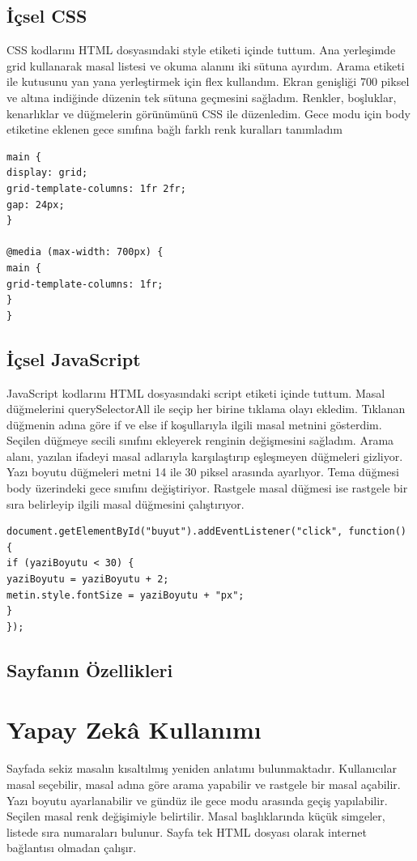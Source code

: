 \documentclass[12pt,a4paper]{article}
\begin{document}
\subsection{İçsel CSS}
CSS kodlarını HTML dosyasındaki style etiketi içinde tuttum. Ana yerleşimde grid kullanarak masal listesi ve okuma alanını iki sütuna ayırdım. Arama etiketi ile kutusunu yan yana yerleştirmek için flex kullandım. Ekran genişliği 700 piksel ve altına indiğinde düzenin tek sütuna geçmesini sağladım. Renkler, boşluklar, kenarlıklar ve düğmelerin görünümünü CSS ile düzenledim. Gece modu için body etiketine eklenen gece sınıfına bağlı farklı renk kuralları tanımladım

\begin{lstlisting}[caption={İçsel CSS'ten önemli bir bölüm}]
main {
display: grid;
grid-template-columns: 1fr 2fr;
gap: 24px;
}

@media (max-width: 700px) {
main {
grid-template-columns: 1fr;
}
}
\end{lstlisting}

\subsection{İçsel JavaScript}
JavaScript kodlarını HTML dosyasındaki script etiketi içinde tuttum. Masal düğmelerini querySelectorAll ile seçip her birine tıklama olayı ekledim. Tıklanan düğmenin adına göre if ve else if koşullarıyla ilgili masal metnini gösterdim. Seçilen düğmeye secili sınıfını ekleyerek renginin değişmesini sağladım. Arama alanı, yazılan ifadeyi masal adlarıyla karşılaştırıp eşleşmeyen düğmeleri gizliyor. Yazı boyutu düğmeleri metni 14 ile 30 piksel arasında ayarlıyor. Tema düğmesi body üzerindeki gece sınıfını değiştiriyor. Rastgele masal düğmesi ise rastgele bir sıra belirleyip ilgili masal düğmesini çalıştırıyor.

\begin{lstlisting}[caption={İçsel JavaScript'ten önemli bir bölüm}]
document.getElementById("buyut").addEventListener("click", function() {
if (yaziBoyutu < 30) {
yaziBoyutu = yaziBoyutu + 2;
metin.style.fontSize = yaziBoyutu + "px";
}
});
\end{lstlisting}

\subsection{Sayfanın Özellikleri}


\section{Yapay Zekâ Kullanımı}
Sayfada sekiz masalın kısaltılmış yeniden anlatımı bulunmaktadır. Kullanıcılar masal seçebilir, masal adına göre arama yapabilir ve rastgele bir masal açabilir. Yazı boyutu ayarlanabilir ve gündüz ile gece modu arasında geçiş yapılabilir. Seçilen masal renk değişimiyle belirtilir. Masal başlıklarında küçük simgeler, listede sıra numaraları bulunur. Sayfa tek HTML dosyası olarak internet bağlantısı olmadan çalışır.
\end{document}
